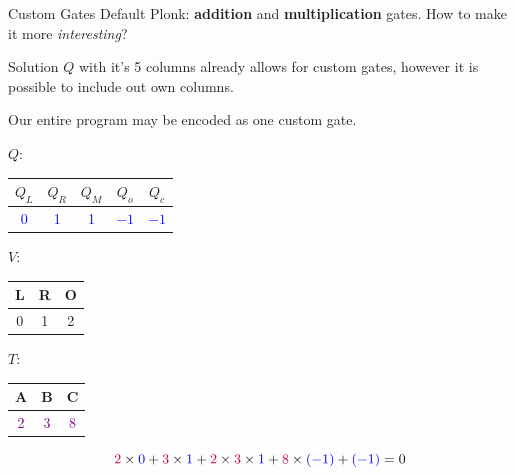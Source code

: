 \documentclass{zkdl-presentation-template}
\begin{document}
    \begin{frame}{Custom Gates}
        Default Plonk: \textbf{addition} and \textbf{multiplication} gates.
        How to make it more \textit{interesting}?
        \begin{block}{Solution}
            $Q$ with it's 5 columns already allows for custom gates, however it is possible to include out own columns.
        \end{block}

        \begin{example}
            Our entire program may be encoded as one custom gate.
            \begin{center}
            \scriptsize
            $Q$: 
                \begin{tabular}{|c|c|c|c|c|}
                    \hline
                    $Q_L$ & $Q_R$ & $Q_M$ & $Q_o$ & $Q_c$ \\ 
                    \hline
                    \textcolor{blue}{0} & \textcolor{blue}{1} & \textcolor{blue}{1} & \textcolor{blue}{$-1$} & \textcolor{blue}{$-1$} \\ 
                    \hline
                \end{tabular}
            \quad $V$:
                \begin{tabular}{|c|c|c|}
                    \hline
                    L & R & O \\
                    \hline
                    0 & 1 & 2 \\
                    \hline
                \end{tabular}
            \quad $T$:
                \begin{tabular}{|c|c|c|}
                    \hline
                    A & B & C \\
                    \hline
                    \textcolor{purple}{2} & \textcolor{purple}{3} & \textcolor{purple}{8} \\
                    \hline
                \end{tabular}
            \end{center}

            \begin{equation*}
                \textcolor{purple}{2} \times \textcolor{blue}{0} + \textcolor{purple}{3} \times \textcolor{blue}{1} + \textcolor{purple}{2} \times \textcolor{purple}{3} \times \textcolor{blue}{1} + \textcolor{purple}{8} \times \textcolor{blue}{(-1)} + \textcolor{blue}{(-1)} = 0
            \end{equation*}
        \end{example}
    \end{frame}
\end{document}
